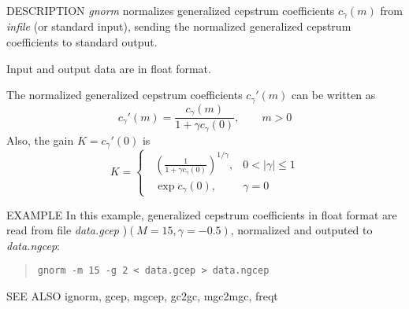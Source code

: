 \begin{qsection}{DESCRIPTION}
{\em gnorm} normalizes generalized cepstrum coefficients $c_\gamma(m)$ 
from {\em infile} (or standard input), 
sending the normalized generalized cepstrum coefficients to standard output.

Input and output data are in float format.

The normalized generalized cepstrum coefficients $c_\gamma'(m)$
can be written as
\begin{displaymath}
c_\gamma'(m) = \frac{c_\gamma(m)}{1+\gamma c_\gamma(0)}, \qquad m>0
\end{displaymath}
Also, the gain $K = c_\gamma'(0)$ is
\begin{displaymath}
K = \begin{cases} \;\;\displaystyle
	  \left(\frac{1}{1+\gamma c_\gamma(0)}\right)^{1/\gamma},
		& 0<|\gamma|\leq 1 \\ \;\;\displaystyle
	  \exp c_\gamma(0),  & \gamma=0
	\end{cases}
\end{displaymath}
\end{qsection}

\begin{options}
\end{options}

\begin{qsection}{EXAMPLE}
In this example, generalized cepstrum coefficients in float format
are read from file {\em data.gcep} )$(M=15, \gamma=-0.5)$,
normalized and outputed to {\em data.ngcep}:
\begin{quote}
 \verb!gnorm -m 15 -g 2 < data.gcep > data.ngcep!
\end{quote} 
\end{qsection}

\begin{qsection}{SEE ALSO}
 ignorm, gcep, mgcep, gc2gc, mgc2mgc, freqt
\end{qsection}
